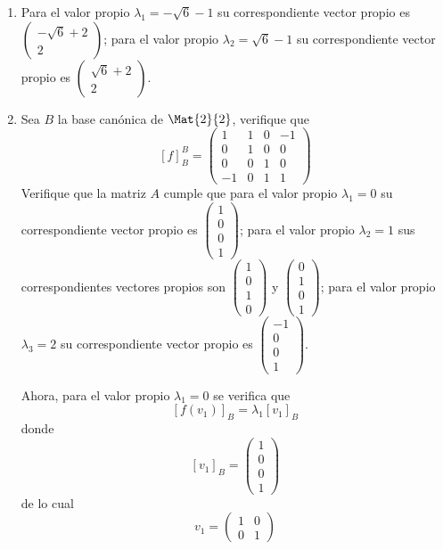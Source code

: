 \documentclass[10pt,a4]{examenEPN}
\begin{document}
\begin{preguntas}
\begin{respuesta}
\begin{enumerate}
    \item Para el valor propio $\lambda_{1} = - \sqrt{6}-1$ su correspondiente vector propio es $\begin{pmatrix}-\sqrt{6}+2\\2\end{pmatrix}$; para el valor propio $\lambda_{2} = \sqrt{6}-1$ su correspondiente vector propio es $\begin{pmatrix}\sqrt{6}+2\\2\end{pmatrix}$.
    \item Sea $B$ la base canónica de $\Mat{2}{2}$, verifique que
    \[
        [f]_{B}^{B} = 
        \begin{pmatrix}
        1&1&0&-1\\
        0&1&0&0\\
        0&0&1&0\\
        -1&0&1&1
        \end{pmatrix}
    \]
    Verifique que la matriz $A$ cumple que para el valor propio $\lambda_{1} = 0$ su correspondiente vector propio es $\begin{pmatrix}1\\0\\0\\1\end{pmatrix}$; para el valor propio $\lambda_{2} = 1$ sus correspondientes vectores propios son $\begin{pmatrix}1\\0\\1\\0\end{pmatrix}$ y $\begin{pmatrix}0\\1\\0\\1\end{pmatrix}$; para el valor propio $\lambda_{3} = 2$ su correspondiente vector propio es $\begin{pmatrix}-1\\0\\0\\1\end{pmatrix}$.
    
    Ahora, para el valor propio $\lambda_{1} = 0$ se verifica que 
    \[
        [f(v_{1})]_{B} = \lambda_{1}[v_{1}]_{B}
    \]
    donde
    \[
        [v_{1}]_{B} = \begin{pmatrix}1\\0\\0\\1\end{pmatrix}
    \]
    de lo cual
    \[
        v_{1} = \begin{pmatrix}1&0\\0&1\end{pmatrix}
    \]
    

\end{enumerate}
\end{respuesta}
\end{preguntas}
\end{document}
